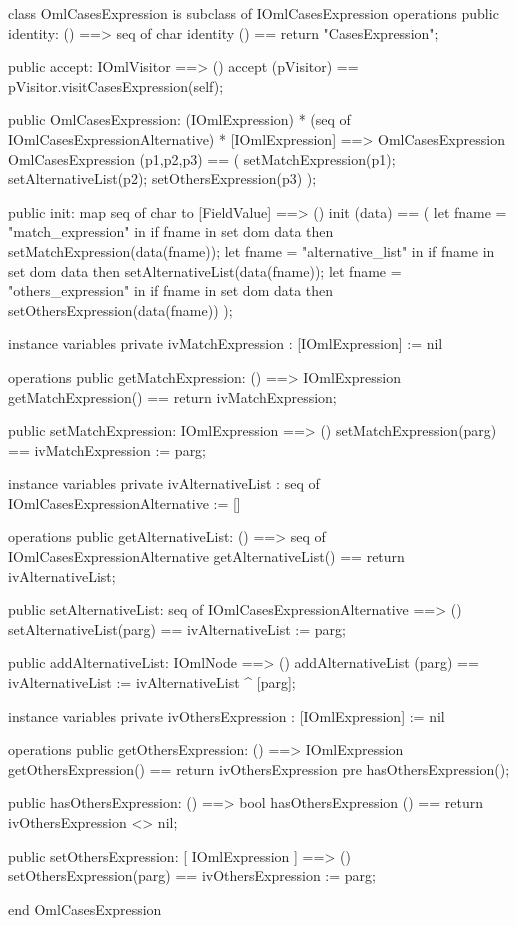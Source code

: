 \begin{vdm_al}
class OmlCasesExpression is subclass of IOmlCasesExpression
operations
  public identity: () ==> seq of char
  identity () == return "CasesExpression";

  public accept: IOmlVisitor ==> ()
  accept (pVisitor) == pVisitor.visitCasesExpression(self);

  public OmlCasesExpression:
      (IOmlExpression) *
      (seq of IOmlCasesExpressionAlternative) *
      [IOmlExpression] ==> OmlCasesExpression
  OmlCasesExpression (p1,p2,p3) == 
   ( setMatchExpression(p1);
     setAlternativeList(p2);
     setOthersExpression(p3) );

  public init: map seq of char to [FieldValue] ==> ()
  init (data) ==
    ( let fname = "match_expression" in
        if fname in set dom data
        then setMatchExpression(data(fname));
      let fname = "alternative_list" in
        if fname in set dom data
        then setAlternativeList(data(fname));
      let fname = "others_expression" in
        if fname in set dom data
        then setOthersExpression(data(fname)) );

instance variables
  private ivMatchExpression : [IOmlExpression] := nil

operations
  public getMatchExpression: () ==> IOmlExpression
  getMatchExpression() == return ivMatchExpression;

  public setMatchExpression: IOmlExpression ==> ()
  setMatchExpression(parg) == ivMatchExpression := parg;

instance variables
  private ivAlternativeList : seq of IOmlCasesExpressionAlternative := []

operations
  public getAlternativeList: () ==> seq of IOmlCasesExpressionAlternative
  getAlternativeList() == return ivAlternativeList;

  public setAlternativeList: seq of IOmlCasesExpressionAlternative ==> ()
  setAlternativeList(parg) == ivAlternativeList := parg;

  public addAlternativeList: IOmlNode ==> ()
  addAlternativeList (parg) == ivAlternativeList := ivAlternativeList ^ [parg];

instance variables
  private ivOthersExpression : [IOmlExpression] := nil

operations
  public getOthersExpression: () ==> IOmlExpression
  getOthersExpression() == return ivOthersExpression
    pre hasOthersExpression();

  public hasOthersExpression: () ==> bool
  hasOthersExpression () == return ivOthersExpression <> nil;

  public setOthersExpression: [ IOmlExpression ] ==> ()
  setOthersExpression(parg) == ivOthersExpression := parg;

end OmlCasesExpression
\end{vdm_al}

